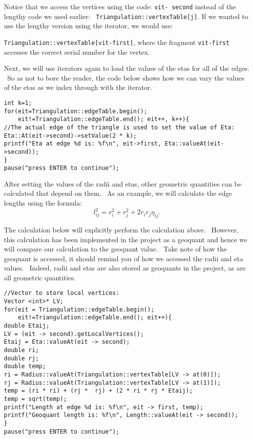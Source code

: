 \documentclass{amsart}
\theoremstyle{plain}
\numberwithin{equation}{section}
\begin{document}
\bigskip 

Notice that we access the vertices using the code: \texttt{vit-\TEXTsymbol{>}%
second} instead of the lengthy code we used earlier: \texttt{%
Triangulation::vertexTable[j]}. If we wanted to use the lengthy version
using the iterator, we would use:

\texttt{Triangulation::vertexTable[vit-\TEXTsymbol{>}first]}, where the
fragment \texttt{vit-\TEXTsymbol{>}first }accesses the correct serial number
for the vertex. \ 

Next, we will use iterators again to load the values of the etas for all of
the edges. \ So as not to bore the reader, the code below shows how we can
vary the values of the etas as we index through with the iterator. \ \newline
\begin{verbatim}
int k=1;
for(eit=Triangulation::edgeTable.begin();
    eit!=Triangulation::edgeTable.end(); eit++, k++){
//The actual edge of the triangle is used to set the value of Eta:
Eta::At(eit->second)->setValue(2 * k);
printf("Eta at edge %d is: %f\n", eit->first, Eta::valueAt(eit->second));
}
pause("press ENTER to continue");
\end{verbatim}

\bigskip 

After setting the values of the radii and etas, other geometric quantities
can be calculated that depend on them. \ As an example, we will calculate
the edge lengths using the formula:%
\begin{equation*}
l_{ij}^{2}=r_{i}^{2}+r_{j}^{2}+2r_{i}r_{j}\eta _{ij}.
\end{equation*}

The calculation below will explicitly perform the calculation above. \
However, this calculation has been implemented in the project as a geoquant
and hence we will compare our calculation to the geoquant value. \ Take note
of how the geoquant is accessed, it should remind you of how we accessed the
radii and eta values. \ Indeed, radii and etas are also stored as geoquants
in the project, as are all geometric quantities. \ \newline
\begin{verbatim}
//Vector to store local vertices:
Vector <int>* LV;
for(eit = Triangulation::edgeTable.begin();
    eit!=Triangulation::edgeTable.end(); eit++){
double Etaij;
LV = (eit -> second).getLocalVertices();
Etaij = Eta::valueAt(eit -> second);
double ri;
double rj;
double temp;
ri = Radius::valueAt(Triangulation::vertexTable[LV -> at(0)]);
rj = Radius::valueAt(Triangulation::vertexTable[LV -> at(1)]);
temp = (ri * ri) + (rj *  rj) + (2 * ri * rj * Etaij);
temp = sqrt(temp);
printf("Length at edge %d is: %f\n", eit -> first, temp);
printf("Geoquant length is: %f\n", Length::valueAt(eit -> second));
}
pause("press ENTER to continue");
\end{verbatim}
\end{document}
